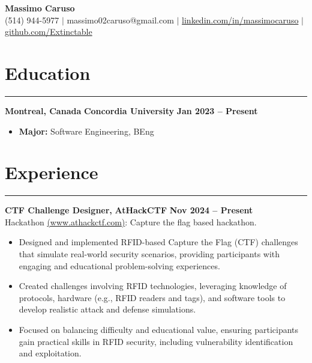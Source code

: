 \documentclass[10pt]{article}
\begin{document}
\begin{center}
    {\Huge \textbf{Massimo Caruso}} \\
    \vspace{1mm}
    {\small 
    \faPhone \hspace{0mm} (514) 944-5977 $\vert$ 
    \faEnvelope \hspace{0mm} massimo02caruso@gmail.com $\vert$ 
    \faLinkedin \hspace{0mm} \href{https://linkedin.com/in/massimocaruso}{linkedin.com/in/massimocaruso} $\vert$ 
    \faGithub \hspace{0mm} \href{https://github.com/Extinctable}{github.com/Extinctable}
    }
\end{center}

\vspace{-8mm}

\section*{Education}
\vspace{-2mm}
\hrule
\vspace{0mm}

\textbf{Montreal, Canada} \hfill \textbf{Concordia University} \hfill \textbf{Jan 2023 -- Present} 
\vspace{-4mm}
\begin{itemize}[left=0.15in, itemsep=0pt]
    \item \textbf{Major:} Software Engineering, BEng
\end{itemize}

\section*{Experience}
\vspace{-2mm}
\hrule
\vspace{0mm}

\textbf{CTF Challenge Designer, } \hfill \textbf{AtHackCTF} \hfill \textbf{Nov 2024 -- Present} \\
{Hackathon {\href{https://www.athackctf.com}{(www.athackctf.com)}: Capture the flag based hackathon.}}
\vspace{-4mm}
\begin{itemize}[left=0.15in, itemsep=0pt]
    \item Designed and implemented RFID-based Capture the Flag (CTF) challenges that simulate real-world security scenarios, providing participants with engaging and educational problem-solving experiences.
    \item Created challenges involving RFID technologies, leveraging knowledge of protocols, hardware (e.g., RFID readers and tags), and software tools to develop realistic attack and defense simulations.
    \item Focused on balancing difficulty and educational value, ensuring participants gain practical skills in RFID security, including vulnerability identification and exploitation.
\end{itemize}
\end{document}

